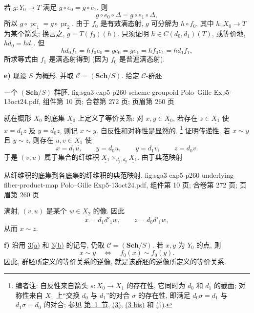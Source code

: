若 \(g:Y_0\to T\) 满足 \(g\circ e_0=g\circ e_1\), 则
\[
  g\circ e_0\circ\Delta=g\circ e_1\circ\Delta,
\]
所以 \(g\circ\operatorname{pr}_1=g\circ\operatorname{pr}_2\).
由于 \(f_0\) 是有效满态射, \(g\) 可分解为 \(h\circ f_0\),
其中 \(h:X_0\to T\) 为某个箭头; 换言之, \(g=T(f_0)(h)\).
只须证明 \(h\in C(d_0,d_1)(T)\), 或等价地, \(hd_0=hd_1\).
但
\[
  hd_0f_1=hf_0e_0=ge_0=ge_1=hf_0e_1=hd_1f_1,
\]
所求等式由 \(f_1\) 是满态射得到 (因为 \(f_0\) 是普遍满态射).

\medskip
{}\label{par:sga3-V-3-e}%
\noindent\textbf{e)} 现设 \(S\) 为概形, 并取 \(\mathscr C=(\mathbf{Sch}/S)\).
给定 \(\mathscr C\)-群胚

  {一个 \((\mathbf{Sch}/S)\)-群胚.}
  {fig:sga3-exp5-p260-scheme-groupoid}
  {Polo--Gille Exp5-13oct24.pdf, 组件第 10 页; 合卷第 272 页; 页眉第 260 页}

\noindent 就在概形 \(X_0\) 的底集 \(\underline{X_0}\) 上定义了等价关系:
对 \(x,y\in\underline{X_0}\), 若存在 \(z\in\underline{X_1}\)
使 \(x=d_1z\) 及 \(y=d_0z\), 则记 \(x\sim y\).
自反性和对称性是显然的.%
\footnote{\label{note:sga3-V-15}编者注: 自反性来自箭头 \(s:X_0\to X_1\)
的存在性, 它同时为 \(d_0\) 和 \(d_1\) 的截面;
对称性来自 \(X_1\) 上``交换 \(d_0\) 与 \(d_1\)''的对合 \(\sigma\)
的存在性, 即满足 \(d_0\sigma=d_1\) 与 \(d_1\sigma=d_0\) 的对合;
参见 \hyperref[sec:sga3-V-1]{第~1~节},
\hyperref[eq:sga3-exp5-3]{(3)},
\hyperref[eq:sga3-exp5-3bis]{(3 bis)} 和
\hyperref[eq:sga3-exp5-dagger]{(\(\dagger\))}.}
证明传递性. 若 \(x\sim y\) 且 \(y\sim z\), 则存在
\(u,v\in\underline{X_1}\) 使
\[
  x=d_1u,\qquad y=d_0u,\qquad y=d_1v,\qquad z=d_0v.
\]
于是 \((v,u)\) 属于集合的纤维积
\(\underline{X_1}\times_{\underline{d_1},\underline{d_0}}
\underline{X_1}\). 由于典范映射

  {从纤维积的底集到各底集的纤维积的典范映射.}
  {fig:sga3-exp5-p260-underlying-fiber-product-map}
  {Polo--Gille Exp5-13oct24.pdf, 组件第 10 页; 合卷第 272 页; 页眉第 260 页}

\noindent 满射, \((v,u)\) 是某个 \(w\in\underline{X_2}\) 的像.
因此
\[
  x=d_1d'_1w,\qquad z=d_0d'_1w,
\]
从而 \(x\sim z\).

\medskip
{}\label{par:sga3-V-3-f}%
\noindent\textbf{f)} 沿用 \hyperref[par:sga3-V-3-a]{3(a)} 和
\hyperref[par:sga3-V-3-b]{3(b)} 的记号, 仍取
\(\mathscr C=(\mathbf{Sch}/S)\). 若 \(x,y\) 为 \(Y_0\) 的点, 则
\[
  x\sim y\quad\Longleftrightarrow\quad f_0(x)\sim f_0(y).
\]
因此, 群胚所定义的等价关系的逆像,
就是该群胚的逆像所定义的等价关系.

